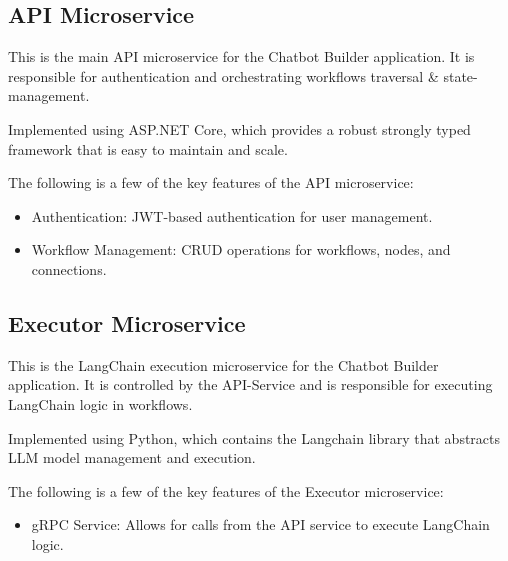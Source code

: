 \subsection{API Microservice}
This is the main API microservice for the Chatbot Builder application. It is responsible for authentication and orchestrating workflows traversal \& state-management.

Implemented using ASP.NET Core, which provides a robust strongly typed framework that is easy to maintain and scale.

The following is a few of the key features of the API microservice:
\begin{itemize}
    \item Authentication: JWT-based authentication for user management.
    \item Workflow Management: CRUD operations for workflows, nodes, and connections.
\end{itemize}

\subsection{Executor Microservice}
This is the LangChain execution microservice for the Chatbot Builder application. It is controlled by the API-Service and is responsible for executing LangChain logic in workflows.

Implemented using Python, which contains the Langchain library that abstracts LLM model management and execution.

The following is a few of the key features of the Executor microservice:
\begin{itemize}
    \item gRPC Service: Allows for calls from the API service to execute LangChain logic.
\end{itemize}